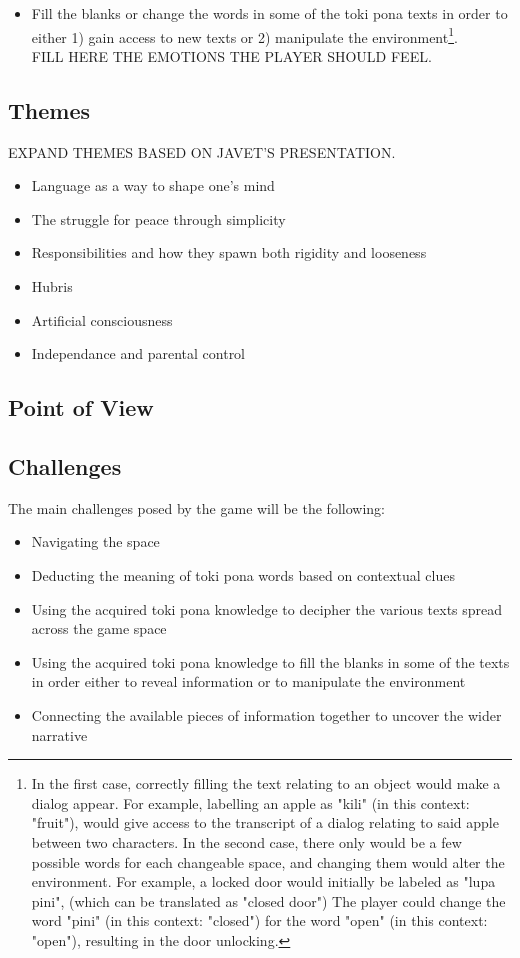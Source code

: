\documentclass{scrartcl}
\begin{document}
\begin{itemize}
				\item Fill the blanks or change the words in some of the toki pona texts in order to either 1) gain access to new texts or 2) manipulate the environment\footnote{In the first case, correctly filling the text relating to an object would make a dialog appear. For example, labelling an apple as "kili" (in this context: "fruit"), would give access to the transcript of a dialog relating to said apple between two characters. In the second case, there only would be a few possible words for each changeable space, and changing them would alter the environment. For example, a locked door would initially be labeled as "lupa pini", (which can be translated as "closed door") The player could change the word "pini" (in this context: "closed") for the word "open" (in this context: "open"), resulting in the door unlocking.}.\\
				FILL HERE THE EMOTIONS THE PLAYER SHOULD FEEL.
			\end{itemize}
		\subsection{Themes}
		EXPAND THEMES BASED ON JAVET'S PRESENTATION.
		\begin{itemize}
			\item Language as a way to shape one's mind
			\item The struggle for peace through simplicity
			\item Responsibilities and how they spawn both rigidity and looseness
			\item Hubris
			\item Artificial consciousness
			\item Independance and parental control
		\end{itemize}
		\subsection{Point of View}
		
		\subsection{Challenges}
		The main challenges posed by the game will be the following:
		\begin{itemize}
			\item Navigating the space
			\item Deducting the meaning of toki pona words based on contextual clues
			\item Using the acquired toki pona knowledge to decipher the various texts spread across the game space
			\item Using the acquired toki pona knowledge to fill the blanks in some of the texts in order either to reveal information or to manipulate the environment
			\item Connecting the available pieces of information together to uncover the wider narrative
		\end{itemize}
\end{document}
